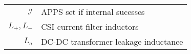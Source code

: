 \begin{scriptsize}
\begin{tabularx}{\textwidth}{r|X}
$\mathcal{I}$               & APPS set if internal sucesses\\
$L_+,L_-$													& CSI current filter inductors\\
$L_a$															& DC-DC transformer leakage inductance\\

\end{tabularx}
\end{scriptsize}
